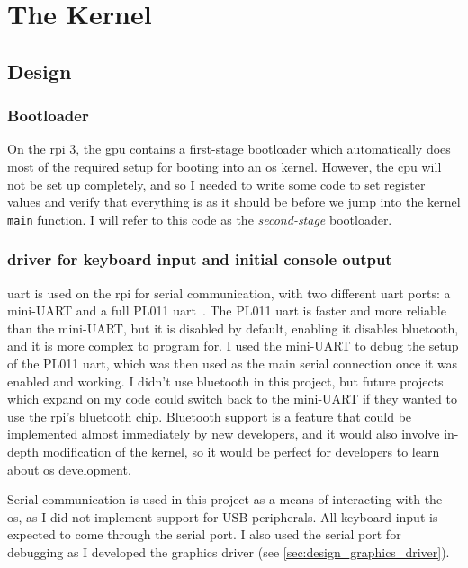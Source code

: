 \documentclass{article}
\begin{document}
\section{The Kernel}
\subsection{Design}
\label{sec:kernel_design}
\subsubsection{Bootloader}
On the \gls{rpi} 3, the \gls{gpu} contains a first-stage bootloader which
automatically does most of the required setup for booting into an \gls{os}
kernel. However, the \gls{cpu} will not be set up completely, and so I needed
to write some code to set register values and verify that everything is as it
should be before we jump into the kernel \texttt{main} function. I will refer
to this code as the \emph{second-stage} bootloader.

\subsubsection{\texorpdfstring{}{UART} driver for keyboard
input and initial console output}
\gls{uart} is used on the \gls{rpi} for serial communication, with two
different \gls{uart} ports: a mini-UART and a full PL011
\gls{uart}~\cite{rpi-uarts}. The PL011 \gls{uart} is faster and more reliable
than the mini-UART, but it is disabled by default, enabling it disables
bluetooth, and it is more complex to program for. I used the mini-UART to
debug the setup of the PL011 \gls{uart}, which was then used as the main serial
connection once it was enabled and working. I didn't use bluetooth in this
project, but future projects which expand on my code could switch back to the
mini-UART if they wanted to use the \gls{rpi}'s bluetooth chip. Bluetooth
support is a feature that could be implemented almost immediately by new
developers, and it would also involve in-depth modification of the kernel, so
it would be perfect for developers to learn about \gls{os} development.

Serial communication is used in this project as a means of interacting with the
\gls{os}, as I did not implement support for USB peripherals. All keyboard
input is expected to come through the serial port. I also used the serial port
for debugging as I developed the graphics driver (see
\autoref{sec:design_graphics_driver}).
\end{document}
